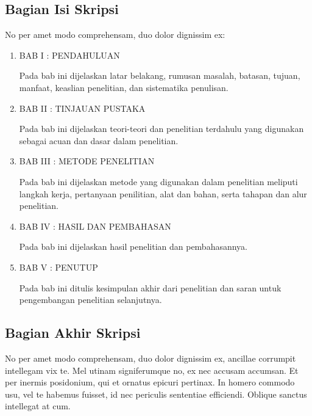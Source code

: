 \subsection{Bagian Isi Skripsi}
No per amet modo comprehensam, duo dolor dignissim ex:\\
\noindent
\begin{enumerate}
\item BAB I : PENDAHULUAN

Pada bab ini dijelaskan latar belakang, rumusan masalah, batasan, tujuan, manfaat, keaslian penelitian, dan sistematika penulisan.

\item BAB II : TINJAUAN PUSTAKA

Pada bab ini dijelaskan teori-teori dan penelitian terdahulu yang digunakan sebagai acuan dan dasar dalam penelitian.

\item BAB III : METODE PENELITIAN

Pada bab ini dijelaskan metode yang digunakan dalam penelitian meliputi langkah kerja, pertanyaan penilitian, alat dan bahan, serta tahapan dan alur penelitian.

\item BAB IV : HASIL DAN PEMBAHASAN

Pada bab ini dijelaskan hasil penelitian dan pembahasannya.

\item BAB V : PENUTUP

Pada bab ini ditulis kesimpulan akhir dari penelitian dan saran untuk pengembangan penelitian selanjutnya.
	\end{enumerate}
\subsection{Bagian Akhir Skripsi}
No per amet modo comprehensam, duo dolor dignissim ex, ancillae corrumpit intellegam vix te. Mel utinam signiferumque no, ex nec accusam accumsan. Et per inermis posidonium, qui et ornatus epicuri pertinax. In homero commodo usu, vel te habemus fuisset, id nec periculis sententiae efficiendi. Oblique sanctus intellegat at cum. \\
\begin{comment}

\end{comment}
